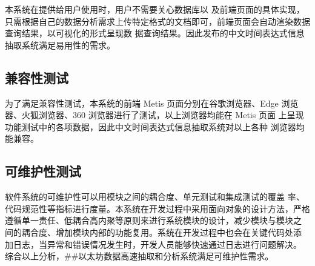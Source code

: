 本系统在提供给用户使用时，用户不需要关心数据库以
及前端页面的具体实现，只需根据自己的数据分析需求上传特定格式的文档即可，前端页面会自动渲染数据查询结果，以可视化的形式呈现数
据查询结果。因此发布的中文时间表达式信息抽取系统满足易用性的需求。

\subsection{兼容性测试}

为了满足兼容性测试，本系统的前端 Metis 页面分别在谷歌浏览器、Edge
浏览器、火狐浏览器、360 浏览器进行了测试，以上浏览器均能在 Metis 页面
上呈现功能测试中的各项数据，因此中文时间表达式信息抽取系统对以上各种
浏览器均能兼容。

\subsection{可维护性测试}

软件系统的可维护性可以用模块之间的耦合度、单元测试和集成测试的覆盖
率、代码规范性等指标进行度量。本系统在开发过程中采用面向对象的设计方法，严格
遵循单一责任、低耦合高内聚等原则来进行系统模块的设计，减少模块与模块之
间的耦合度、增加模块内部的功能复用。系统在开发过程中也会在关键代码处添
加日志，当异常和错误情况发生时，开发人员能够快速通过日志进行问题解决。
综合以上分析，##以太坊数据高速抽取和分析系统满足可维护性需求。
